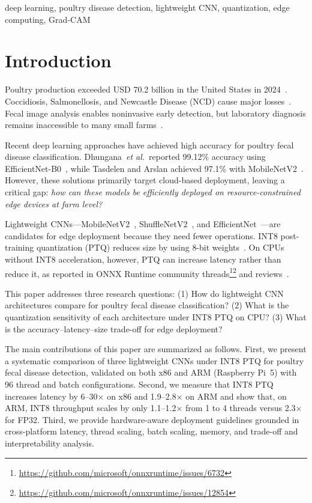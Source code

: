 \documentclass[conference,a4paper]{IEEEtran}
\begin{document}
\begin{IEEEkeywords}
deep learning, poultry disease detection, lightweight CNN, quantization, edge computing, Grad-CAM
\end{IEEEkeywords}

\section{Introduction}

Poultry production exceeded USD 70.2 billion in the United States in 2024~\cite{dhungana2025}. Coccidiosis, Salmonellosis, and Newcastle Disease (NCD) cause major losses~\cite{machuve2022}. Fecal image analysis enables noninvasive early detection, but laboratory diagnosis remains inaccessible to many small farms~\cite{tasdelen2025}.

Recent deep learning approaches have achieved high accuracy for poultry fecal disease classification. Dhungana~\textit{et al.}~reported 99.12\% accuracy using EfficientNet-B0~\cite{dhungana2025}, while Tasdelen and Arslan achieved 97.1\% with MobileNetV2~\cite{tasdelen2025}. However, these solutions primarily target cloud-based deployment, leaving a critical gap: \textit{how can these models be efficiently deployed on resource-constrained edge devices at farm level?}

Lightweight CNNs---MobileNetV2~\cite{mobilenetv2}, ShuffleNetV2~\cite{shufflenetv2}, and EfficientNet~\cite{efficientnet}---are candidates for edge deployment because they need fewer operations. INT8 post-training quantization (PTQ) reduces size by using 8-bit weights~\cite{jacob2018}. On CPUs without INT8 acceleration, however, PTQ can increase latency rather than reduce it, as reported in ONNX Runtime community threads\footnote{\url{https://github.com/microsoft/onnxruntime/issues/6732}}\footnote{\url{https://github.com/microsoft/onnxruntime/issues/12854}} and reviews~\cite{maulana2026}.

This paper addresses three research questions: (1) How do lightweight CNN architectures compare for poultry fecal disease classification? (2) What is the quantization sensitivity of each architecture under INT8 PTQ on CPU? (3) What is the accuracy--latency--size trade-off for edge deployment?

The main contributions of this paper are summarized as follows. First, we present a systematic comparison of three lightweight CNNs under INT8 PTQ for poultry fecal disease detection, validated on both x86 and ARM (Raspberry Pi~5) with 96 thread and batch configurations. Second, we measure that INT8 PTQ increases latency by 6--30$\times$ on x86 and 1.9--2.8$\times$ on ARM and show that, on ARM, INT8 throughput scales by only 1.1--1.2$\times$ from 1 to 4 threads versus 2.3$\times$ for FP32. Third, we provide hardware-aware deployment guidelines grounded in cross-platform latency, thread scaling, batch scaling, memory, and trade-off and interpretability analysis.
\end{document}

